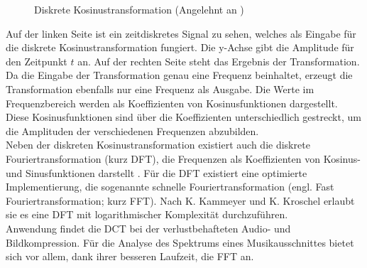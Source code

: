 \documentclass[11pt,a4paper]{article}
\begin{document}
\begin{figure}[!ht]
\centering
{}
\hspace{20pt}
\caption[Diskrete Kosinustransformation]{Diskrete Kosinustransformation (Angelehnt an \cite[S. 2]{KosTrans})}
\label{fig:KosinusTransformation}
\end{figure}
\noindent
Auf der linken Seite ist ein zeitdiskretes Signal zu sehen, welches als Eingabe für die diskrete Kosinustransformation fungiert. Die y-Achse gibt die Amplitude für den Zeitpunkt $t$ an. Auf der rechten Seite steht das Ergebnis der Transformation. Da die Eingabe der Transformation genau eine Frequenz beinhaltet, erzeugt die Transformation ebenfalls nur eine Frequenz als Ausgabe.
Die Werte im Frequenzbereich werden als Koeffizienten von Kosinusfunktionen dargestellt. Diese Kosinusfunktionen sind über die Koeffizienten unterschiedlich gestreckt, um die Amplituden der verschiedenen Frequenzen abzubilden.\\
Neben der diskreten Kosinustransformation existiert auch die diskrete Fouriertransformation (kurz DFT), die Frequenzen als Koeffizienten von Kosinus- und Sinusfunktionen darstellt \cite[S. 185]{lerch2012introduction}. Für die DFT existiert eine optimierte Implementierung, die sogenannte schnelle Fouriertransformation (engl. Fast Fouriertransformation; kurz FFT). Nach K. Kammeyer und K. Kroschel \cite[S. 283]{kammeyer2013digitale} erlaubt sie es eine DFT mit logarithmischer Komplexität durchzuführen.\\
Anwendung findet die DCT bei der verlustbehafteten Audio- und Bildkompression. Für die Analyse des Spektrums eines Musikausschnittes bietet sich vor allem, dank ihrer besseren Laufzeit, die FFT an.
\end{document}
